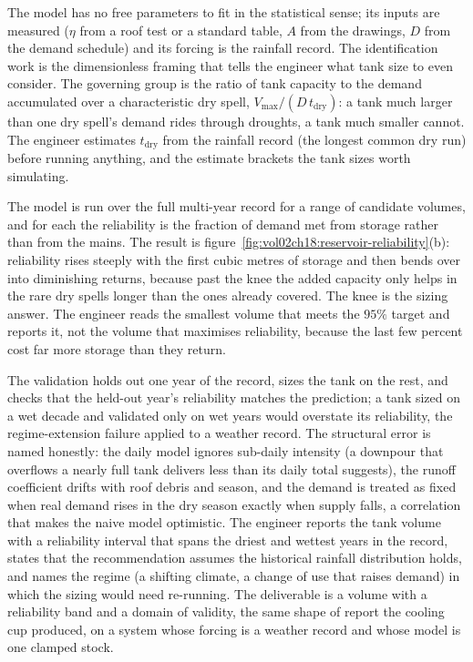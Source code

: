  The model has no free
parameters to fit in the statistical sense; its inputs are measured
($\eta$ from a roof test or a standard table, $A$ from the drawings, $D$
from the demand schedule) and its forcing is the rainfall record. The
identification work is the dimensionless framing that tells the engineer
what tank size to even consider. The governing group is the ratio of tank
capacity to the demand accumulated over a characteristic dry spell,
$V_{\max}/(D\,t_{\text{dry}})$: a tank much larger than one dry spell's
demand rides through droughts, a tank much smaller cannot. The engineer
estimates $t_{\text{dry}}$ from the rainfall record (the longest common
dry run) before running anything, and the estimate brackets the tank sizes
worth simulating.

 The model is run
over the full multi-year record for a range of candidate volumes, and for
each the reliability is the fraction of demand met from storage rather than
from the mains. The result is
figure~\ref{fig:vol02ch18:reservoir-reliability}(b): reliability rises
steeply with the first cubic metres of storage and then bends over into
diminishing returns, because past the knee the added capacity only helps in
the rare dry spells longer than the ones already covered. The knee is the
sizing answer. The engineer reads the smallest volume that meets the $95\%$
target and reports it, not the volume that maximises reliability, because
the last few percent cost far more storage than they return.



 The
validation holds out one year of the record, sizes the tank on the rest,
and checks that the held-out year's reliability matches the prediction; a
tank sized on a wet decade and validated only on wet years would overstate
its reliability, the regime-extension failure applied to a weather record.
The structural error is named honestly: the daily model ignores sub-daily
intensity (a downpour that overflows a nearly full tank delivers less than
its daily total suggests), the runoff coefficient drifts with roof debris
and season, and the demand is treated as fixed when real demand rises in the
dry season exactly when supply falls, a correlation that makes the naive
model optimistic. The engineer reports the tank volume with a reliability
interval that spans the driest and wettest years in the record, states that
the recommendation assumes the historical rainfall distribution holds, and
names the regime (a shifting climate, a change of use that raises demand) in
which the sizing would need re-running. The deliverable is a volume with a
reliability band and a domain of validity, the same shape of report the
cooling cup produced, on a system whose forcing is a weather record and
whose model is one clamped stock.

